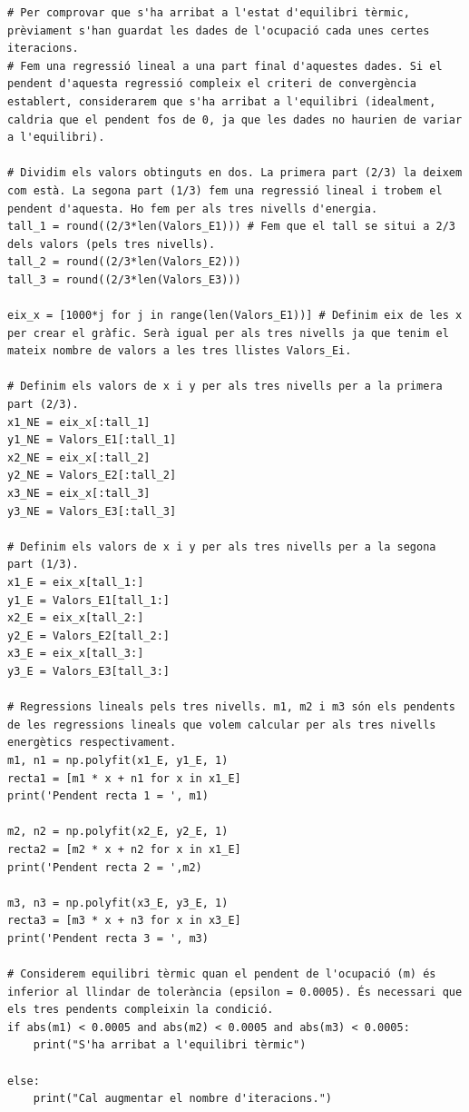 \documentclass[a4paper,10.5pt]{report}
\begin{document}
\begin{lstlisting}[caption={Garantia d'assoliment de l'estat d'equilibri tèrmic.}]
# Per comprovar que s'ha arribat a l'estat d'equilibri tèrmic, prèviament s'han guardat les dades de l'ocupació cada unes certes iteracions. 
# Fem una regressió lineal a una part final d'aquestes dades. Si el pendent d'aquesta regressió compleix el criteri de convergència establert, considerarem que s'ha arribat a l'equilibri (idealment, caldria que el pendent fos de 0, ja que les dades no haurien de variar a l'equilibri). 

# Dividim els valors obtinguts en dos. La primera part (2/3) la deixem com està. La segona part (1/3) fem una regressió lineal i trobem el pendent d'aquesta. Ho fem per als tres nivells d'energia.
tall_1 = round((2/3*len(Valors_E1))) # Fem que el tall se situi a 2/3 dels valors (pels tres nivells).
tall_2 = round((2/3*len(Valors_E2)))
tall_3 = round((2/3*len(Valors_E3)))

eix_x = [1000*j for j in range(len(Valors_E1))] # Definim eix de les x per crear el gràfic. Serà igual per als tres nivells ja que tenim el mateix nombre de valors a les tres llistes Valors_Ei. 

# Definim els valors de x i y per als tres nivells per a la primera part (2/3).
x1_NE = eix_x[:tall_1]
y1_NE = Valors_E1[:tall_1]
x2_NE = eix_x[:tall_2]
y2_NE = Valors_E2[:tall_2]
x3_NE = eix_x[:tall_3]
y3_NE = Valors_E3[:tall_3]

# Definim els valors de x i y per als tres nivells per a la segona part (1/3).
x1_E = eix_x[tall_1:]
y1_E = Valors_E1[tall_1:]
x2_E = eix_x[tall_2:]
y2_E = Valors_E2[tall_2:]
x3_E = eix_x[tall_3:]
y3_E = Valors_E3[tall_3:]

# Regressions lineals pels tres nivells. m1, m2 i m3 són els pendents de les regressions lineals que volem calcular per als tres nivells energètics respectivament. 
m1, n1 = np.polyfit(x1_E, y1_E, 1)
recta1 = [m1 * x + n1 for x in x1_E]
print('Pendent recta 1 = ', m1)

m2, n2 = np.polyfit(x2_E, y2_E, 1)
recta2 = [m2 * x + n2 for x in x1_E]
print('Pendent recta 2 = ',m2)

m3, n3 = np.polyfit(x3_E, y3_E, 1)
recta3 = [m3 * x + n3 for x in x3_E]
print('Pendent recta 3 = ', m3)

# Considerem equilibri tèrmic quan el pendent de l'ocupació (m) és inferior al llindar de tolerància (epsilon = 0.0005). És necessari que els tres pendents compleixin la condició. 
if abs(m1) < 0.0005 and abs(m2) < 0.0005 and abs(m3) < 0.0005:
	print("S'ha arribat a l'equilibri tèrmic")

else: 
	print("Cal augmentar el nombre d'iteracions.")
	
\end{lstlisting}
\end{document}
